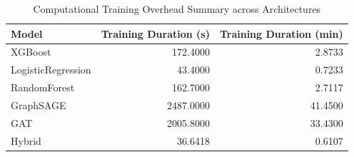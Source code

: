 \begin{table}
\caption{Computational Training Overhead Summary across Architectures}
\label{tab:training_times}
\begin{tabular}{lrr}
\toprule
Model & Training Duration (s) & Training Duration (min) \\
\midrule
XGBoost & 172.4000 & 2.8733 \\
LogisticRegression & 43.4000 & 0.7233 \\
RandomForest & 162.7000 & 2.7117 \\
GraphSAGE & 2487.0000 & 41.4500 \\
GAT & 2005.8000 & 33.4300 \\
Hybrid & 36.6418 & 0.6107 \\
\bottomrule
\end{tabular}
\end{table}
